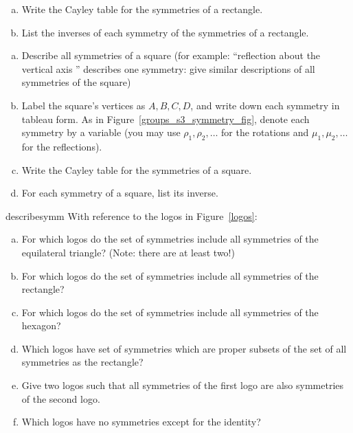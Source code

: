 \bigskip
\begin{exercise}{}
\begin{enumerate}[(a)]
\item
Write the Cayley table for the symmetries of a rectangle.
\item
List the inverses of each symmetry of the symmetries of a rectangle.
\end{enumerate}
\end{exercise}

\begin{exercise}{}
\begin{enumerate}[(a)]
\item
Describe all symmetries of a square  (for example: ``reflection about the vertical axis '' describes one symmetry: give similar descriptions of all symmetries of the square)
\item
Label the square's vertices as $A, B, C, D$, and write down each symmetry in tableau form. As in Figure~\ref{groups_s3_symmetry_fig}, denote each symmetry by a variable (you may use $\rho_1, \rho_2, \ldots$ for the rotations and $\mu_1, \mu_2, \ldots$ for the reflections).
\item
Write the Cayley table for the symmetries of a square.
\item
For each symmetry of a square, list its inverse.
\end{enumerate}
\end{exercise}

\begin{exercise}{describesymm}
With reference to the logos in Figure~\ref{logos}:
\begin{enumerate}[(a)]
\item
For which logos do the set of symmetries include all symmetries of the equilateral triangle? (Note: there are at least two!)
\item
For which logos do the set of symmetries include all symmetries of the rectangle?
\item
For which logos do the set of symmetries include all symmetries of the hexagon?
\item
Which logos have set of symmetries which are proper subsets of the set of all symmetries as the rectangle?
\item
Give two logos such that all symmetries of the first logo are also symmetries of the second logo.
\item
Which logos have no symmetries except for the identity?
\end{enumerate}
\end{exercise}  

